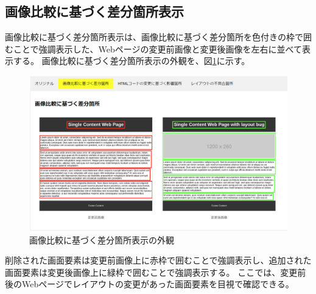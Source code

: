 \subsection{画像比較に基づく差分箇所表示}\label{subsec:images_tab}
画像比較に基づく差分箇所表示は、画像比較に基づく差分箇所を色付きの枠で囲むことで強調表示した、Webページの変更前画像と変更後画像を左右に並べて表示する。
画像比較に基づく差分箇所表示の外観を、図\ref{fig: Appearance_images_tab}に示す。
\begin{figure}[tp]
      \begin{center}
            \includegraphics[width=1.0\columnwidth]{image/3_images_tab2.png}
            \caption{画像比較に基づく差分箇所表示の外観}
            \label{fig: Appearance_images_tab}
      \end{center}
\end{figure}
削除された画面要素は変更前画像上に赤枠で囲むことで強調表示し、追加された画面要素は変更後画像上に緑枠で囲むことで強調表示する。
ここでは、変更前後のWebページでレイアウトの変更があった画面要素を目視で確認できる。

